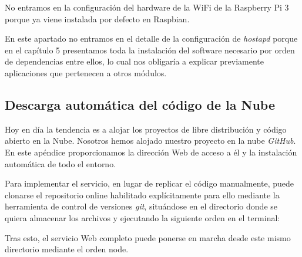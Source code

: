 \begin{appendices}
No entramos en la configuración del hardware de la WiFi de la Raspberry Pi 3 porque ya viene instalada por defecto en Raspbian.

En este apartado no entramos en el detalle de la configuración de \emph{hostapd} porque en el capítulo 5 presentamos toda la instalación del software necesario por orden de dependencias entre ellos, lo cual nos obligaría a explicar previamente aplicaciones que pertenecen a otros módulos.
\cleardoublepage
{}%
\begin{center}
\begin{minipage}{.75\textwidth}
\section{Descarga automática del código de la Nube}\label{ApendiceB}

Hoy en día la tendencia es a alojar los proyectos de libre distribución y código abierto en la Nube. Nosotros hemos alojado nuestro proyecto en la nube \emph{GitHub}. En este apéndice proporcionamos la dirección Web de acceso a él y la instalación automática de todo el entorno.
\end{minipage}
\end{center}
\clearpage%

Para implementar el servicio, en lugar de replicar el código manualmente, puede clonarse el repositorio online habilitado explícitamente para ello mediante la herramienta de control de versiones \emph{git}, situándose en el directorio donde se quiera almacenar los archivos y ejecutando la siguiente orden en el terminal: 


Tras esto, el servicio Web completo puede ponerse en marcha desde este mismo directorio mediante el orden node.


\end{appendices}
